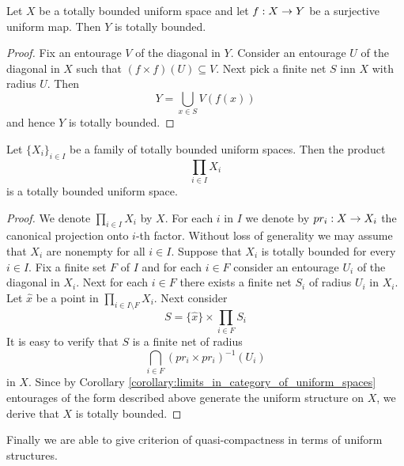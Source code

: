 \documentclass[10pt]{amsart}
\begin{document}
\begin{theorem}\label{theorem:surjective_image_of_totally_bounded_space_is_totally_bounded}
	Let $X$ be a totally bounded uniform space and let $f:X\rightarrow Y$ be a surjective uniform map. Then $Y$ is totally bounded.
\end{theorem}
\begin{proof}
	Fix an entourage $V$ of the diagonal in $Y$. Consider an entourage $U$ of the diagonal in $X$ such that $\left(f\times f\right)\left(U\right) \subseteq V$. Next pick a finite net $S$ inn $X$ with radius $U$. Then
	$$Y = \bigcup_{x\in S}V\left(f(x)\right)$$
	and hence $Y$ is totally bounded.
\end{proof}

\begin{theorem}\label{theorem:product_of_totally_bounded_spaces_is_totally_bounded}
	Let $\{X_i\}_{i \in I}$ be a family of totally bounded uniform spaces. Then the product
	$$\prod_{i \in I}X_i$$
	is a totally bounded uniform space.
\end{theorem}
\begin{proof}
	We denote $\prod_{i \in I}X_i$ by $X$. For each $i$ in $I$ we denote by $pr_i:X\rightarrow X_i$ the canonical projection onto $i$-th factor. Without loss of generality we may assume that $X_i$ are nonempty for all $i \in I$. Suppose that $X_i$ is totally bounded for every $i \in I$. Fix a finite set $F$ of $I$ and for each $i \in F$ consider an entourage $U_i$ of the diagonal in $X_i$. Next for each $i \in F$ there exists a finite net $S_i$ of radius $U_i$ in $X_i$. Let $\hat{x}$ be a point in $\prod_{i \in I\setminus F}X_i$. Next consider
	$$S = \{\hat{x}\}\times \prod_{i \in F}S_i$$
	It is easy to verify that $S$ is a finite net of radius
	$$\bigcap_{i \in F}\left(pr_i\times pr_i\right)^{-1}(U_i)$$
	in $X$. Since by Corollary \ref{corollary:limits_in_category_of_uniform_spaces} entourages of the form described above generate the uniform structure on $X$, we derive that $X$ is totally bounded.
\end{proof}
\noindent
Finally we are able to give criterion of quasi-compactness in terms of uniform structures.
\end{document}

